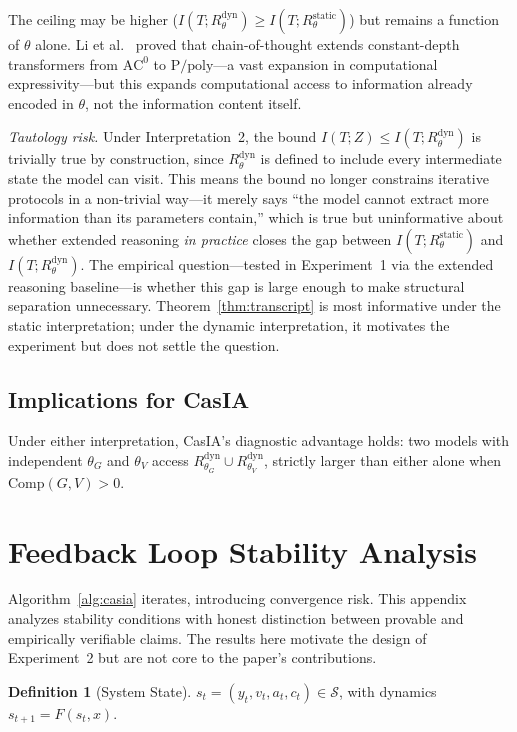 \documentclass[11pt,a4paper]{article}
\theoremstyle{definition}
\newtheorem{definition}{Definition}[section]
\newcommand{\thetaG}{\theta_G}
\newcommand{\thetaV}{\theta_V}
\begin{document}
The ceiling may be higher ($I(T; R_\theta^\text{dyn}) \geq I(T; R_\theta^\text{static})$) but remains a function of $\theta$ alone. Li et al.~\cite{li2024cot} proved that chain-of-thought extends constant-depth transformers from $\text{AC}^0$ to $\text{P/poly}$---a vast expansion in computational expressivity---but this expands computational access to information already encoded in $\theta$, not the information content itself.

\emph{Tautology risk.} Under Interpretation~2, the bound $I(T;Z) \leq I(T; R_\theta^\text{dyn})$ is trivially true by construction, since $R_\theta^\text{dyn}$ is defined to include every intermediate state the model can visit. This means the bound no longer constrains iterative protocols in a non-trivial way---it merely says ``the model cannot extract more information than its parameters contain,'' which is true but uninformative about whether extended reasoning \emph{in practice} closes the gap between $I(T; R_\theta^\text{static})$ and $I(T; R_\theta^\text{dyn})$. The empirical question---tested in Experiment~1 via the extended reasoning baseline---is whether this gap is large enough to make structural separation unnecessary. Theorem~\ref{thm:transcript} is most informative under the static interpretation; under the dynamic interpretation, it motivates the experiment but does not settle the question.

\subsection{Implications for CasIA}

Under either interpretation, CasIA's diagnostic advantage holds: two models with independent $\thetaG$ and $\thetaV$ access $R_{\thetaG}^\text{dyn} \cup R_{\thetaV}^\text{dyn}$, strictly larger than either alone when $\mathrm{Comp}(G,V) > 0$.


\section{Feedback Loop Stability Analysis}
\label{app:stability}

Algorithm~\ref{alg:casia} iterates, introducing convergence risk. This appendix analyzes stability conditions with honest distinction between provable and empirically verifiable claims. The results here motivate the design of Experiment~2 but are not core to the paper's contributions.

\begin{definition}[System State]
$s_t = (y_t, v_t, a_t, c_t) \in \mathcal{S}$, with dynamics $s_{t+1} = F(s_t, x)$.
\end{definition}
\end{document}
